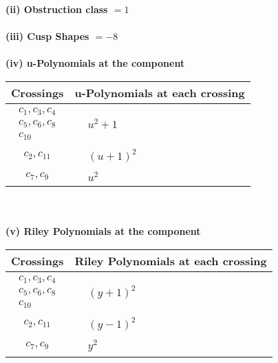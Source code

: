 \documentclass[1p]{elsarticle_modified}
\theoremstyle{definition}
\begin{document}
\flushleft \textbf{(ii) Obstruction class $= 1$}\\~\\
\flushleft \textbf{(iii) Cusp Shapes $= -8$}\\~\\
\newpage\renewcommand{\arraystretch}{1}
\flushleft \textbf{(iv) u-Polynomials at the component}\newline \\
\begin{tabular}{m{50pt}|m{274pt}}
Crossings & \hspace{64pt}u-Polynomials at each crossing \\
\hline $$\begin{aligned}c_{1},c_{3},c_{4}\\c_{5},c_{6},c_{8}\\c_{10}\end{aligned}$$&$\begin{aligned}
&u^2+1
\end{aligned}$\\
\hline $$\begin{aligned}c_{2},c_{11}\end{aligned}$$&$\begin{aligned}
&(u+1)^2
\end{aligned}$\\
\hline $$\begin{aligned}c_{7},c_{9}\end{aligned}$$&$\begin{aligned}
&u^2
\end{aligned}$\\
\hline
\end{tabular}\\~\\
\newpage\renewcommand{\arraystretch}{1}
\flushleft \textbf{(v) Riley Polynomials at the component}\newline \\
\begin{tabular}{m{50pt}|m{274pt}}
Crossings & \hspace{64pt}Riley Polynomials at each crossing \\
\hline $$\begin{aligned}c_{1},c_{3},c_{4}\\c_{5},c_{6},c_{8}\\c_{10}\end{aligned}$$&$\begin{aligned}
&(y+1)^2
\end{aligned}$\\
\hline $$\begin{aligned}c_{2},c_{11}\end{aligned}$$&$\begin{aligned}
&(y-1)^2
\end{aligned}$\\
\hline $$\begin{aligned}c_{7},c_{9}\end{aligned}$$&$\begin{aligned}
&y^2
\end{aligned}$\\
\hline
\end{tabular}\\~\\
\end{document}
